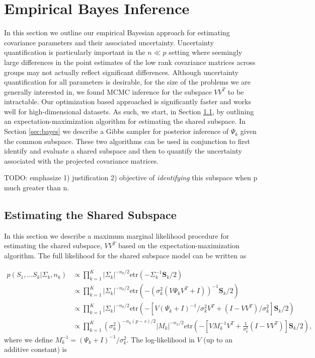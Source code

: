 \documentclass[12pt]{article}
\newcommand{\etr}{\text{etr}}
\begin{document}
\section{Empirical Bayes Inference}
\label{sec:inference}

In this section we outline our empirical Bayesian approach for estimating
covariance parameters and their associated uncertainty.  
Uncertainty quantification is particularly important in the $n \ll p$
setting where seemingly large differences in the point estimates of
the low rank covariance matrices across groups may not actually
reflect significant differences.  Although uncertainty quantification
for all parameters is desirable, for the size of the problems we are
generally interested in, we found MCMC inference for the subspace
$VV^T$ to be intractable.  Our optimization based approached is
significantly faster and works well for high-dimensional datasets.  As
such, we start, in Section \ref{sec:em}, by outlining an
expectation-maximization algorithm for estimating the shared
subspace. In Section \ref{sec:bayes} we describe a Gibbs sampler for
posterior inference of $\Psi_k$ given the common subspace.  These two
algorithms can be used in conjunction to first identify and evaluate a
shared subspace and then to quantify the uncertainty associated with
the projected covariance matrices.

TODO: emphasize 1) justification 2) objective of \emph{identifying} this
subspace when p much greater than n.

\subsection{Estimating the  Shared Subspace}
\label{sec:em}

In this section we describe a maximum marginal likelihood procedure for
estimating the shared subspace, $VV^T$ based on the
expectation-maximization algorithm.  The full likelihood
for the shared subspace model can be written as

\begin{align}
\nonumber p(S_1, ... S_k | \Sigma_k,n_k) &\propto \prod_{k=1}^K |\Sigma_k|^{-n_k/2}\etr(-\Sigma_k^{-1}\mathbf{S}_k/2)  \\
\nonumber &\propto \prod_{k=1}^K  |\Sigma_k|^{-n_k/2}\etr(-(\sigma_k^2(V\Psi_kV^T +
  I))^{-1}\mathbf{S}_k/2) \\
\nonumber &\propto \prod_{k=1}^K  |\Sigma_k|^{-n_k/2}\etr(-\left[V(\Psi_k +
  I)^{-1}/\sigma_k^2 V^T + (I-VV^T)/\sigma^2_k\right]\mathbf{S}_k/2)
  \\
&\propto \prod_{k=1}^K  (\sigma_k^2)^{-n_k(p-s)/2}|M_k|^{-n_k/2}\etr(-\left[VM_k^{-1}V^T + \frac{1}{\sigma^2_k} (I-VV^T)\right]\mathbf{S}_k/2) ,
\end{align}
%
\noindent where we define $M_k^{-1} = (\Psi_k + I) ^{-1}/\sigma_k^2$.  The log-likelihood in
$V$ (up to an additive constant) is
\end{document}

